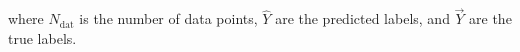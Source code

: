 \documentclass[runningheads]{llncs}
\begin{document}
where $N_{\mathrm{dat}}$ is the number of data points, $\hat{Y}$ are the predicted labels, and $\vec{Y}$ are the true labels.


\end{document}
